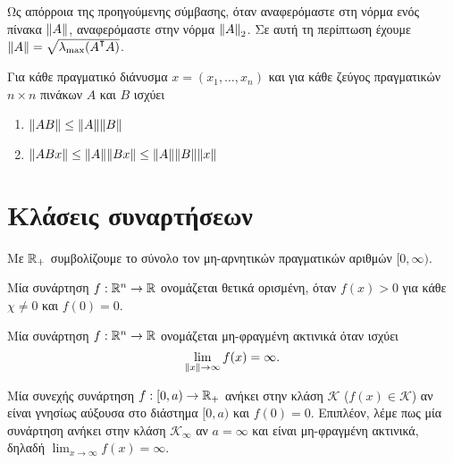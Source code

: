     \begin{convention}
        Ως απόρροια της προηγούμενης σύμβασης, όταν αναφερόμαστε στη νόρμα ενός πίνακα $\norm{A}$, αναφερόμαστε στην νόρμα $\norm{A}_2$. Σε αυτή τη περίπτωση έχουμε $\norm{A} = \sqrt{\lambda_{\max}(A^\T A)}$.
    \end{convention}

    \begin{property}
        Για κάθε πραγματικό διάνυσμα $x = (x_1, \ldots, x_n)$ και για κάθε ζεύγος πραγματικών $n \times n$ πινάκων $A$ και $B$ ισχύει
        \begin{enumerate}
            \item $\norm{AB} \leq \norm{A} \norm{B}$
            \item $\norm{ABx} \leq \norm{A} \norm{Bx} \leq \norm{A} \norm{B} \norm{x}$
        \end{enumerate}
    \end{property}

\section{Κλάσεις συναρτήσεων}

    \begin{convention}
        Με $\mathbb{R}_+$ συμβολίζουμε το σύνολο τον μη-αρνητικών πραγματικών αριθμών $[0, \infty)$.
    \end{convention}

    \begin{definition}
        Μία συνάρτηση $f: \mathbb{R}^n \rightarrow \mathbb{R}$ ονομάζεται θετικά ορισμένη, όταν $f(x) > 0$ για κάθε $χ \neq 0$ και $f(0) = 0$.
    \end{definition}

    \begin{definition}
        Μία συνάρτηση $f: \mathbb{R}^n \rightarrow \mathbb{R}$ ονομάζεται μη-φραγμένη ακτινικά όταν ισχύει
        \[
            \lim_{\norm{x} \rightarrow \infty} f(x) = \infty.
        \]
    \end{definition}

    \begin{definition}
        Μία συνεχής συνάρτηση $f:[0, a) \rightarrow \mathbb{R}_+$ ανήκει στην κλάση $\mathcal K$ ($f(x) \in \mathcal K$) αν είναι γνησίως αύξουσα στο διάστημα $[0, a)$ και $f(0) = 0$. Επιπλέον, λέμε πως μία συνάρτηση ανήκει στην κλάση $\mathcal K_\infty$ αν $a = \infty$ και είναι μη-φραγμένη ακτινικά, δηλαδή $\lim_{x \rightarrow \infty} f(x) = \infty$.
    \end{definition}

